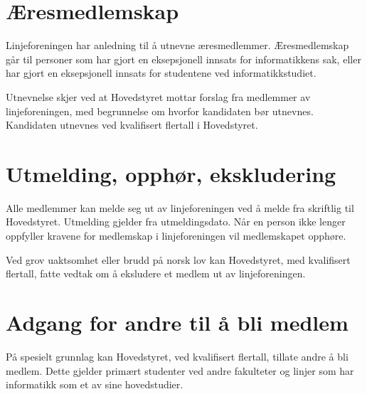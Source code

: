 \section{Æresmedlemskap}

Linjeforeningen har anledning til å utnevne æresmedlemmer. Æresmedlemskap går \linebreak til personer som har gjort en eksepsjonell innsats for informatikkens sak, eller har gjort en eksepsjonell innsats for studentene ved informatikkstudiet. \newline 


Utnevnelse skjer ved at Hovedstyret mottar forslag fra medlemmer av linjeforeningen, med begrunnelse om hvorfor kandidaten bør utnevnes. Kandidaten utnevnes ved kvalifisert flertall i Hovedstyret.

\section{Utmelding, opphør, ekskludering}
Alle medlemmer kan melde seg ut av linjeforeningen ved å melde fra skriftlig til \mbox{Hovedstyret}. Utmelding gjelder fra utmeldingsdato. Når en person ikke lenger \linebreak oppfyller kravene for medlemskap i linjeforeningen vil medlemskapet opphøre. \newline

Ved grov uaktsomhet eller brudd på norsk lov kan Hovedstyret, med kvalifisert \linebreak flertall, fatte vedtak om å eksludere et medlem ut av linjeforeningen. \newline

\section{Adgang for andre til å bli medlem}

På spesielt grunnlag kan Hovedstyret, ved kvalifisert flertall, tillate andre å bli medlem. Dette gjelder primært studenter ved andre fakulteter og linjer som har informatikk som et av sine hovedstudier. 